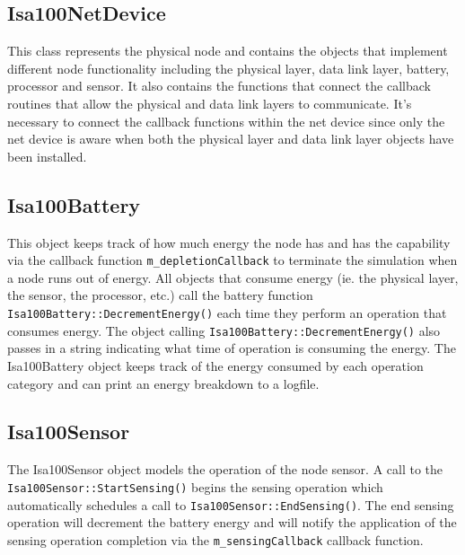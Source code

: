 \documentclass[12pt,letterpaper]{article}
\begin{document}
\subsection{Isa100NetDevice}

This class represents the physical node and contains the objects that implement different node functionality including the physical layer, data link layer, battery, processor and sensor.  It also contains the functions that connect the callback routines that allow the physical and data link layers to communicate.  It's necessary to connect the callback functions within the net device since only the net device is aware when both the physical layer and data link layer objects have been installed.


\subsection{Isa100Battery}

This object keeps track of how much energy the node has and has the capability via the callback function {\tt m\_depletionCallback} to terminate the simulation when a node runs out of energy.  All objects that consume energy (ie. the physical layer, the sensor, the processor, etc.) call the battery function {\tt Isa100Battery::DecrementEnergy()} each time they perform an operation that consumes energy.  The object calling {\tt Isa100Battery::DecrementEnergy()} also passes in a string indicating what time of operation is consuming the energy.  The Isa100Battery object keeps track of the energy consumed by each operation category and can print an energy breakdown to a logfile.

\subsection{Isa100Sensor}

The Isa100Sensor object models the operation of the node sensor.  A call to the {\tt Isa100Sensor::StartSensing()} begins the sensing operation which automatically schedules a call to {\tt Isa100Sensor::EndSensing()}.  The end sensing operation will decrement the battery energy and will notify the application of the sensing operation completion via the {\tt m\_sensingCallback} callback function.
\end{document}
